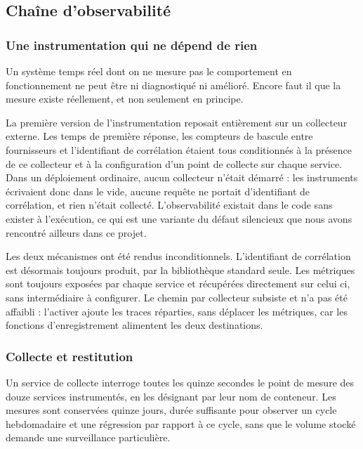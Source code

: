 \subsection{Chaîne d'observabilité}

\subsubsection{Une instrumentation qui ne dépend de rien}

Un système temps réel dont on ne mesure pas le comportement en fonctionnement ne peut être ni diagnostiqué ni amélioré. Encore faut il que la mesure existe réellement, et non seulement en principe.

La première version de l'instrumentation reposait entièrement sur un collecteur externe. Les temps de première réponse, les compteurs de bascule entre fournisseurs et l'identifiant de corrélation étaient tous conditionnés à la présence de ce collecteur et à la configuration d'un point de collecte sur chaque service. Dans un déploiement ordinaire, aucun collecteur n'était démarré : les instruments écrivaient donc dans le vide, aucune requête ne portait d'identifiant de corrélation, et rien n'était collecté. L'observabilité existait dans le code sans exister à l'exécution, ce qui est une variante du défaut silencieux que nous avons rencontré ailleurs dans ce projet.

Les deux mécanismes ont été rendus inconditionnels. L'identifiant de corrélation est désormais toujours produit, par la bibliothèque standard seule. Les métriques sont toujours exposées par chaque service et récupérées directement sur celui ci, sans intermédiaire à configurer. Le chemin par collecteur subsiste et n'a pas été affaibli : l'activer ajoute les traces réparties, sans déplacer les métriques, car les fonctions d'enregistrement alimentent les deux destinations.

\subsubsection{Collecte et restitution}

Un service de collecte interroge toutes les quinze secondes le point de mesure des douze services instrumentés, en les désignant par leur nom de conteneur. Les mesures sont conservées quinze jours, durée suffisante pour observer un cycle hebdomadaire et une régression par rapport à ce cycle, sans que le volume stocké demande une surveillance particulière.

